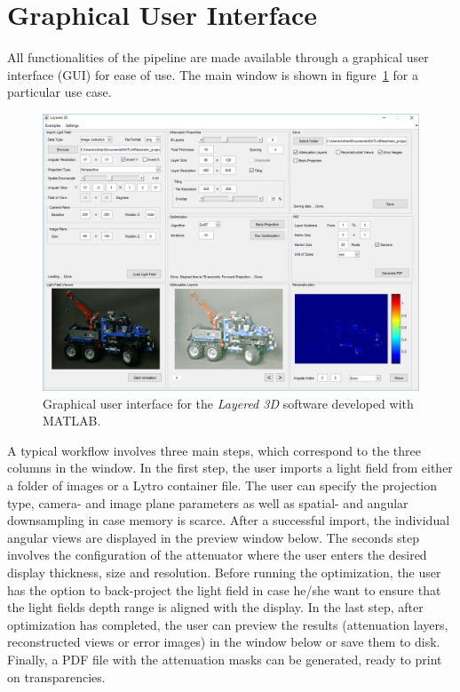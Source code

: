 
\section{Graphical User Interface}
\label{sec:GUI}

All functionalities of the pipeline are made available through a graphical user interface \mbox{(GUI)} for ease of use.
The main window is shown in figure~\ref{fig:gui_overview} for a particular use case.
\begin{figure}[tb]
	\includegraphics[width = \linewidth]{../Figures/gui/overview}
	\caption[Graphical user interface]
			{Graphical user interface for the \emph{Layered 3D} software developed with MATLAB.}
	\label{fig:gui_overview}
\end{figure}
A typical workflow involves three main steps, which correspond to the three columns in the window.
In the first step, the user imports a light field from either a folder of images or a \mbox{Lytro} container file.
The user can specify the projection type, camera- and image plane parameters as well as spatial- and angular downsampling in case memory is scarce.
After a successful import, the individual angular views are displayed in the preview window below.
The seconds step involves the configuration of the attenuator where the user enters the desired display thickness, size and resolution.
Before running the optimization, the user has the option to back-project the light field in case he/she want to ensure that the light fields depth range is aligned with the display.
In the last step, after optimization has completed, the user can preview the results (attenuation layers, reconstructed views or error images) in the window below or save them to disk.
Finally, a \mbox{PDF} file with the attenuation masks can be generated, ready to print on transparencies.

